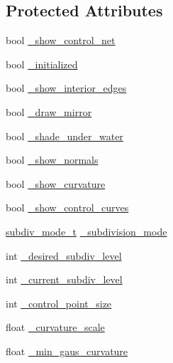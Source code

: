 \subsection*{Protected Attributes}
\begin{DoxyCompactItemize}
\item 
bool \hyperlink{classShipCAD_1_1SubdivisionSurface_ab9bb374cf1368b4a2c779f953bca88a8}{\-\_\-show\-\_\-control\-\_\-net}
\item 
bool \hyperlink{classShipCAD_1_1SubdivisionSurface_a828f85ee49e1481e95f61b919070842c}{\-\_\-initialized}
\item 
bool \hyperlink{classShipCAD_1_1SubdivisionSurface_a4458d02152bd97495938586c89e6d9e2}{\-\_\-show\-\_\-interior\-\_\-edges}
\item 
bool \hyperlink{classShipCAD_1_1SubdivisionSurface_a4ee73ae98bddfe1819419afd1d5ba029}{\-\_\-draw\-\_\-mirror}
\item 
bool \hyperlink{classShipCAD_1_1SubdivisionSurface_ac3294d41679de31e588d603e3428565e}{\-\_\-shade\-\_\-under\-\_\-water}
\item 
bool \hyperlink{classShipCAD_1_1SubdivisionSurface_a0cc840743e7afcd136ab864ace158a17}{\-\_\-show\-\_\-normals}
\item 
bool \hyperlink{classShipCAD_1_1SubdivisionSurface_abe2167085eac50c986b074635b610462}{\-\_\-show\-\_\-curvature}
\item 
bool \hyperlink{classShipCAD_1_1SubdivisionSurface_ae240b2177e0af0bd1512c94b524f22dd}{\-\_\-show\-\_\-control\-\_\-curves}
\item 
\hyperlink{namespaceShipCAD_a4a9d1acfd6a2e1e9078a5dcc36f0c817}{subdiv\-\_\-mode\-\_\-t} \hyperlink{classShipCAD_1_1SubdivisionSurface_a0af5c881dfa24574962f42d80da997ee}{\-\_\-subdivision\-\_\-mode}
\item 
int \hyperlink{classShipCAD_1_1SubdivisionSurface_aeec20f09be87e6d57d88f903853ca96f}{\-\_\-desired\-\_\-subdiv\-\_\-level}
\item 
int \hyperlink{classShipCAD_1_1SubdivisionSurface_a9e5424746eced5d0a06ccbe4055bd06f}{\-\_\-current\-\_\-subdiv\-\_\-level}
\item 
int \hyperlink{classShipCAD_1_1SubdivisionSurface_a7ad820b9d312c8ecde939b5345690d35}{\-\_\-control\-\_\-point\-\_\-size}
\item 
float \hyperlink{classShipCAD_1_1SubdivisionSurface_acf241b41a8ca897306decbbab8e44c69}{\-\_\-curvature\-\_\-scale}
\item 
float \hyperlink{classShipCAD_1_1SubdivisionSurface_ac343c30f7e4e6a5926fdfed7da3f9385}{\-\_\-min\-\_\-gaus\-\_\-curvature}

\end{DoxyCompactItemize}
